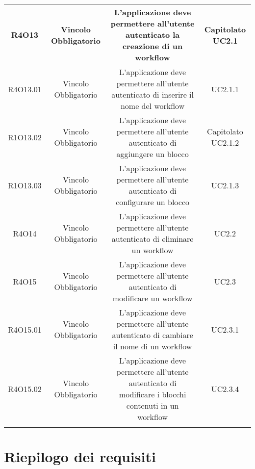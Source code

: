 \begin{tabularx}{\textwidth}{|C|C|C|C|}
	\hline
	R4O13&Vincolo Obbligatorio&L'applicazione deve permettere all'utente autenticato la creazione di un workflow& Capitolato UC2.1\\
	\hline
	R4O13.01&Vincolo Obbligatorio& L'applicazione deve permettere all'utente autenticato di inserire il nome del workflow  & UC2.1.1\\
	\hline
	R1O13.02&Vincolo Obbligatorio&L'applicazione deve permettere all'utente autenticato di aggiungere un blocco & Capitolato UC2.1.2\\
	\hline	
	R1O13.03&Vincolo Obbligatorio&L'applicazione deve permettere all'utente autenticato di configurare un blocco&UC2.1.3\\
	\hline
	R4O14&Vincolo Obbligatorio&L'applicazione deve permettere all'utente autenticato di eliminare un workflow&UC2.2\\
	\hline
	R4O15&Vincolo Obbligatorio& L'applicazione deve permettere all'utente autenticato di  modificare un workflow  &UC2.3\\
	\hline
	R4O15.01&Vincolo Obbligatorio& L'applicazione deve permettere all'utente autenticato di cambiare il nome di un workflow  &UC2.3.1\\
	\hline
	R4O15.02&Vincolo Obbligatorio& L'applicazione deve permettere all'utente autenticato di modificare i blocchi contenuti in un workflow  &UC2.3.4\\
	\hline
	\caption{Tabella requisiti di vincolo}
\end{tabularx}

\section{Riepilogo dei requisiti}
\newpage
